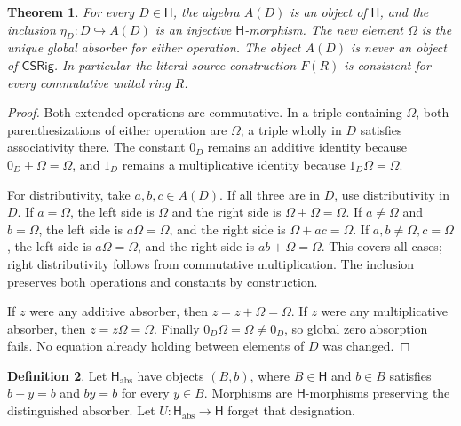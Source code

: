\documentclass[11pt]{article}
\newtheorem{theorem}{Theorem}[section]
\theoremstyle{definition}
\newtheorem{definition}[theorem]{Definition}
\newcommand{\HH}{\mathsf H}
\newcommand{\SSS}{\mathsf{CSRig}}
\newcommand{\Om}{\Omega}
\begin{document}
\begin{theorem}\label{thm:Aaxioms}
For every \(D\in\HH\), the algebra \(A(D)\) is an object of \(\HH\),
and the inclusion \(\eta_D:D\hookrightarrow A(D)\) is an injective
\(\HH\)-morphism. The new element \(\Om\) is the unique global absorber
for either operation. The object \(A(D)\) is never an object of \(\SSS\).
In particular the literal source construction \(F(R)\) is consistent
for every commutative unital ring \(R\).
\end{theorem}
\begin{proof}
Both extended operations are commutative. In a triple containing \(\Om\),
both parenthesizations of either operation are \(\Om\); a triple wholly
in \(D\) satisfies associativity there. The constant \(0_D\) remains
an additive identity because \(0_D+\Om=\Om\), and \(1_D\) remains a
multiplicative identity because \(1_D\Om=\Om\).

For distributivity, take \(a,b,c\in A(D)\). If all three are in \(D\),
use distributivity in \(D\). If \(a=\Om\), the left side is \(\Om\)
and the right side is \(\Om+\Om=\Om\). If \(a\ne\Om\) and
\(b=\Om\), the left side is \(a\Om=\Om\), and the right side is
\(\Om+ac=\Om\). If \(a,b\ne\Om,c=\Om\), the left side is
\(a\Om=\Om\), and the right side is \(ab+\Om=\Om\). This covers
all cases; right distributivity follows from commutative multiplication.
The inclusion preserves both operations and constants by construction.

If \(z\) were any additive absorber, then \(z=z+\Om=\Om\).
If \(z\) were any multiplicative absorber, then \(z=z\Om=\Om\).
Finally \(0_D\Om=\Om\ne0_D\), so global zero absorption fails.
No equation already holding between elements of \(D\) was changed.
\end{proof}

\begin{definition}
Let \(\HH_{\mathrm{abs}}\) have objects \((B,b)\), where \(B\in\HH\)
and \(b\in B\) satisfies \(b+y=b\) and \(by=b\) for every \(y\in B\).
Morphisms are \(\HH\)-morphisms preserving the distinguished absorber.
Let \(U:\HH_{\mathrm{abs}}\to\HH\) forget that designation.
\end{definition}
\end{document}
